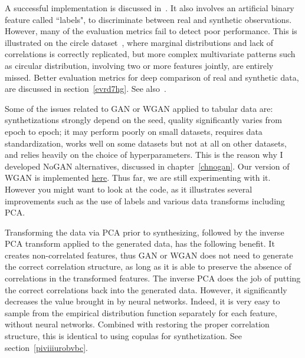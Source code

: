 \documentclass[oneside,10pt]{book}
\begin{document}
A successful implementation is discussed in~\cite{ieeewgan}. It also involves an artificial binary feature called ``labels", 
to discriminate between real and synthetic observations. However, many of the evaluation metrics fail to detect poor performance. This is illustrated on 
 the circle dataset~\cite{vgvendors}, where marginal distributions and lack of correlations is correctly replicated, but more complex multivariate patterns such
 as circular distribution, involving two or more features jointly, are entirely missed. Better evaluation metrics for 
\textcolor{index}{deep comparison} of real and synthetic data, are discussed in section~\ref{evrd7hg}.
 See also~\cite{ieeeaccess22}.

Some of the issues related to GAN or WGAN applied to tabular data are: synthetizations strongly depend on the seed, quality significantly varies from 
 epoch to epoch; it may perform poorly on small datasets, requires data standardization, works well on some datasets but not at all on other datasets, and relies heavily on the choice of hyperparameters. This is the reason why I developed NoGAN alternatives, discussed in chapter~\ref{chnogan}. Our version of WGAN 
 is implemented \href{https://github.com/VincentGranville/Main/blob/main/WGAN.py}{here}. Thus far, we are still experimenting with it. However you might want to look at the code, as it illustrates several improvements such as the use of labels and various data transforms including PCA. 

Transforming the data via PCA prior to synthesizing, followed by the inverse PCA transform applied to the generated data, has the following benefit.
 It creates non-correlated features, thus GAN or WGAN does not need to generate the correct correlation structure, as long as it is able to
 preserve the absence of correlations in the transformed features. The inverse PCA does the job of putting the correct correlations back into the generated data. However, it significantly decreases the value brought in by neural networks. Indeed, it is very easy to sample from the
 \textcolor{index}{empirical distribution function} separately for each feature, without neural networks. Combined with restoring the proper correlation structure,
 this is identical to using \textcolor{index}{copulas} for synthetization. See section~\ref{piviiiurobvbc}. 
\end{document}

